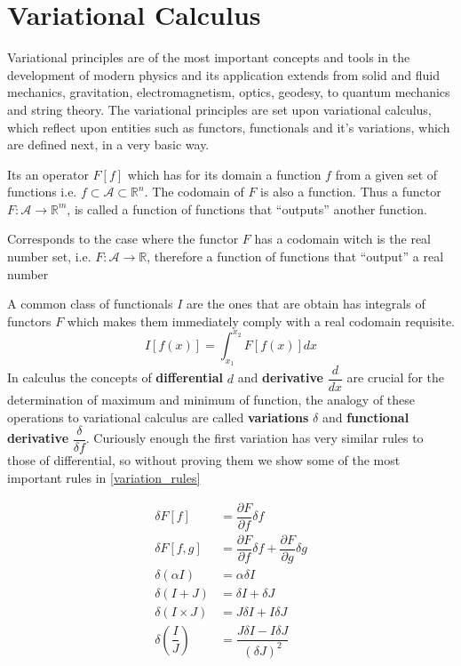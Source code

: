 \section{Variational Calculus}
Variational principles are of the most important concepts and tools in the development of modern physics and its application extends from solid and fluid mechanics, gravitation, electromagnetism, optics, geodesy, to quantum mechanics and string theory.
The variational principles are set upon variational calculus, which reflect upon entities such as functors, functionals and it's  variations, which are defined next, in a very basic way.
\vspace{5mm}
\begin{defi} 
Its an operator $F[f]$ which has for its domain a function $f$ from a given set of functions i.e. $f \subset \mathcal{A} \subset \mathbb{R}^n$. The codomain of $F$ is also a function. Thus a functor $F:\mathcal{A} \rightarrow \mathbb{R}^m$, is called a function of functions that ``outputs'' another function.  
\end{defi}
\begin{defi} 
Corresponds to the case where the functor $F$ has a codomain witch is the real number set, i.e. $F:\mathcal{A} \rightarrow \mathbb{R}$, therefore a function of functions that ``output'' a real number 
\end{defi}

A common class of  functionals $I$ are the ones that are obtain has integrals of functors $F$ which makes them immediately comply with a real codomain requisite.
\begin{equation}
I[f(x)]=\int_{x_1}^{x_2}F[f(x)]dx
\label{integral_variation}
\end{equation}  
In calculus the concepts of \textbf{differential} $d$ and \textbf{derivative} $\dfrac{d}{dx}$ are crucial for the determination of maximum and minimum of function, the analogy of these operations to variational calculus are called \textbf{variations} $\delta$ and \textbf{functional derivative} $\dfrac{\delta}{\delta f}$.
Curiously enough the first variation has very similar rules to those of differential, so without proving them we show some of the most important rules in \eqref{variation_rules}

\begin{align}
\delta F[f]&=\dfrac{\partial F}{\partial f}\delta f\\
\delta F[f,g]&=\dfrac{\partial F}{\partial f}\delta f + \dfrac{\partial F}{\partial g}\delta g\\
\delta (\alpha I)&= \alpha \delta I\\
\delta (I+J)&=\delta I + \delta J\\
\delta (I\times J)&=J\delta I + I\delta J\\
\delta \left( \dfrac{I}{J} \right)&=\dfrac{J\delta I - I\delta J}{(\delta J)^2}
\end{align}\label{variation_rules}

